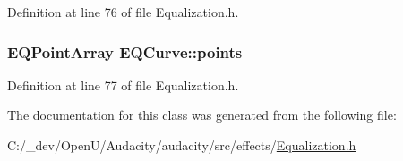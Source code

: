 Definition at line 76 of file Equalization.\+h.

\subsubsection[{\texorpdfstring{points}{points}}]{\setlength{\rightskip}{0pt plus 5cm}E\+Q\+Point\+Array E\+Q\+Curve\+::points}\hypertarget{class_e_q_curve_a3dacc6899796ffc4386d3c368720f38c}{}\label{class_e_q_curve_a3dacc6899796ffc4386d3c368720f38c}


Definition at line 77 of file Equalization.\+h.



The documentation for this class was generated from the following file\+:\begin{DoxyCompactItemize}
\item 
C\+:/\+\_\+dev/\+Open\+U/\+Audacity/audacity/src/effects/\hyperlink{_equalization_8h}{Equalization.\+h}\end{DoxyCompactItemize}

